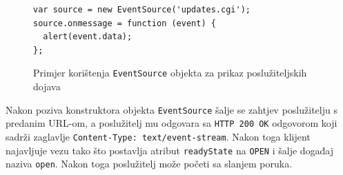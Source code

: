\documentclass[times, utf8, zavrsni]{fer}
\begin{document}
\begin{figure}
\begin{lstlisting}
var source = new EventSource('updates.cgi');
source.onmessage = function (event) {
  alert(event.data);
};
\end{lstlisting}
\caption{Primjer korištenja {\tt EventSource} objekta za prikaz poslužiteljskih dojava}
\label{lst:eventsource}
\end{figure}

Nakon poziva konstruktora objekta {\tt EventSource} šalje se zahtjev poslužitelju s predanim URL-om, a poslužitelj mu odgovara sa {\tt HTTP 200 OK} odgovorom koji sadrži zaglavlje {\tt Content-Type: text/event-stream}. Nakon toga klijent najavljuje vezu tako što postavlja atribut {\tt readyState} na {\tt OPEN} i šalje događaj naziva {\tt open}. Nakon toga poslužitelj može početi sa slanjem poruka.
\end{document}
